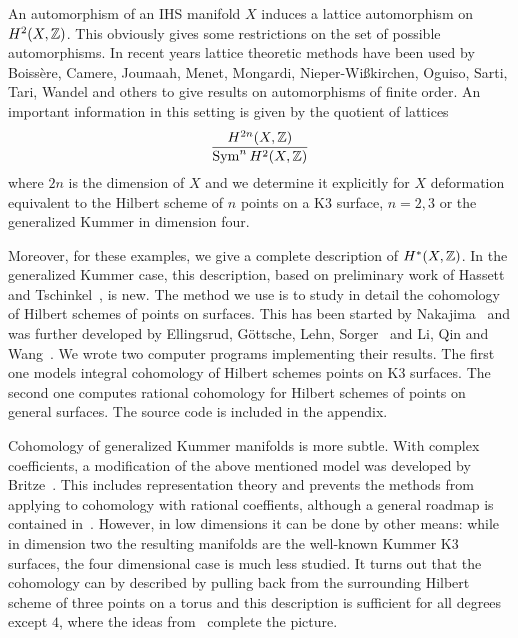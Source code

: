 An automorphism of an IHS manifold $X$ induces a lattice automorphism on $H^2(X,\mathbb{Z})$. This obviously gives some restrictions on the set of possible automorphisms.
In recent years lattice theoretic methods have been used by
Boiss\`ere, Camere, Joumaah, Menet, Mongardi, Nieper-Wi\ss kirchen, Oguiso, Sarti, Tari, Wandel and others to give results on
automorphisms of finite order. 
An important information in this setting is given by the quotient of lattices
$$
\frac{H^{2n}(X,\mathbb{Z})}{\operatorname{Sym}^n H^2(X,\mathbb{Z})}
$$
where $2n$ is the dimension of $X$ and we determine it explicitly for $X$ deformation equivalent to the Hilbert scheme of $n$ points on a K3 surface, $n=2,3$ or the generalized Kummer in dimension four. 

Moreover, for these examples, we give a complete description of $H^*(X,\mathbb{Z})$. In the generalized Kummer case, this description, based on preliminary work of Hassett and Tschinkel~\cite{Hassett}, is new. 
The method we use is to study in detail the cohomology of Hilbert schemes of points on surfaces. This has been started by Nakajima~\cite{Nakajima} and was further developed by Ellingsrud, G\"ottsche, Lehn, Sorger~\cite{EGL,LehnSorger} and Li, Qin and Wang~\cite{LiQinWang,LiQinWang2,QinWang}.
We wrote two computer programs implementing their results. The first one models integral cohomology of Hilbert schemes points on K3 surfaces. The second one computes rational cohomology for Hilbert schemes of points on general surfaces. The source code is included in the appendix. 

Cohomology of generalized Kummer manifolds is more subtle. With complex coefficients, a modification of the above mentioned model was developed by Britze~\cite{Britze}. This includes representation theory and prevents the methods from applying to cohomology with rational coeffients, although a general roadmap is contained in~\cite{Twisted}.
However, in low dimensions it can be done by other means: while in dimension two the resulting manifolds are the well-known Kummer K3 surfaces, the four dimensional case is much less studied. It turns out that the cohomology can by described by pulling back from the surrounding Hilbert scheme of three points on a torus and this description is sufficient for all degrees except $4$, where the ideas from~\cite{Hassett} complete the picture.

